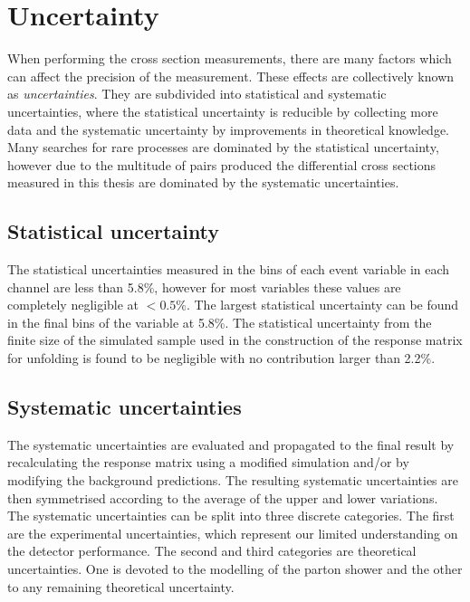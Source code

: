 \chapter{Uncertainty}
\label{ch:uncertainty}

When performing the cross section measurements, there are many factors which can affect the precision of the measurement. 
These effects are collectively known as \textit{uncertainties}.
They are subdivided into statistical and systematic uncertainties, where the statistical uncertainty is reducible by collecting more data and the systematic uncertainty by improvements in theoretical knowledge.
Many searches for rare \SM{} processes are dominated by the statistical uncertainty, however due to the multitude of \ttbar{} pairs produced the differential cross sections measured in this thesis are dominated by the systematic uncertainties.

\section{Statistical uncertainty} %
\label{sec:statistical_uncertainty}

The statistical uncertainties measured in the bins of each event variable in each channel are less than 5.8\%, however for most variables these values are completely negligible at $<0.5\%$.
The largest statistical uncertainty can be found in the final bins of the \ptmiss{} variable at 5.8\%.
The statistical uncertainty from the finite size of the simulated \powhegpythia{} sample used in the construction of the response matrix for unfolding is found to be negligible with no contribution larger than 2.2\%.

\section{Systematic uncertainties} %
\label{sec:systematic_uncertainty}

The systematic uncertainties are evaluated and propagated to the final result by recalculating the response matrix using a modified \ttbar{} simulation and/or by modifying the background predictions.
The resulting systematic uncertainties are then symmetrised according to the average of the upper and lower variations.
The systematic uncertainties can be split into three discrete categories.
The first are the experimental uncertainties, which represent our limited understanding on the detector performance.
The second and third categories are theoretical uncertainties. 
One is devoted to the modelling of the parton shower and the other to any remaining theoretical uncertainty.

